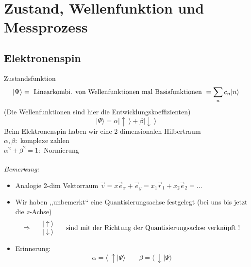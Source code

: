 \section{Zustand, Wellenfunktion und Messprozess}

\subsection{Elektronenspin}

Zustandsfunktion
\begin{equation*}
|\Psi\rangle = \textrm{ Linearkombi. von Wellenfunktionen mal Basisfunktionen } = \sum_n c_n |n\rangle
\end{equation*}
(Die Wellenfunktionen sind hier die Entwicklungskoeffizienten)
\begin{equation*}
|\Psi \rangle = \alpha |\uparrow \: \rangle + \beta |\downarrow \: \rangle
\end{equation*}
Beim Elektronenspin haben wir eine 2-dimensionalen Hilbertraum \mau\\[5pt]
$ \alpha, \beta : $ komplexe zahlen\\
$ \alpha^2 + \beta^2 = 1 : $ Normierung\\[5pt]
\\[5pt]
\emph{Bemerkung:}
\begin{itemize}
	\item Analogie 2-dim Vektorraum $ \vec{v} = x \vec{e}_x +  \vec{e}_y = x_1 \vec{r}_1 + x_2 \vec{e}_2 = \dots $
	\item Wir haben ,,unbemerkt`` eine Quantisierungsachse festgelegt (bei uns bis jetzt die $ z $-Achse)\\
	\begin{equation*}
	\Rightarrow \quad \begin{array}{l}
	| \uparrow \: \rangle \\ | \downarrow \: \rangle
	\end{array} \quad \textrm{ sind mit der Richtung der Quantisierungsachse verknüpft !}
	\end{equation*}
	\item  Erinnerung:
	\begin{equation*}
	\alpha = \langle \: \uparrow | \Psi \rangle \qquad \beta = \langle \: \downarrow | \Psi \rangle
	\end{equation*}
\end{itemize}
